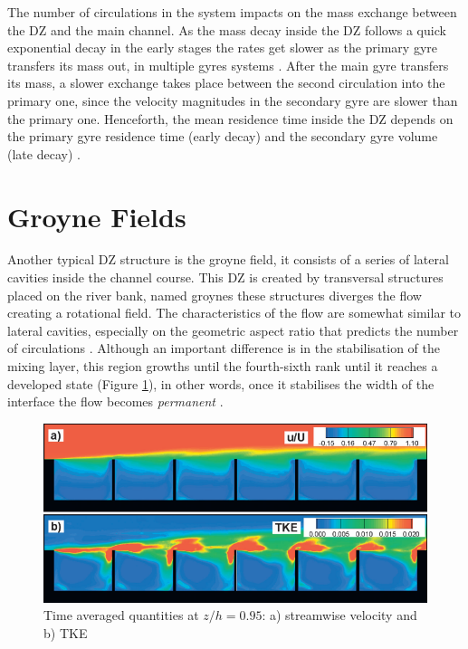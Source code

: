The number of circulations in the system impacts on the mass exchange between the DZ and the main channel. As the mass decay inside the DZ follows a quick exponential decay in the early stages the rates get slower as the primary gyre transfers its mass out, in multiple gyres systems \cite{jackson2012}. After the main gyre transfers its mass, a slower exchange takes place between the second circulation into the primary one, since the velocity magnitudes in the secondary gyre are slower than the primary one. Henceforth, the mean residence time inside the DZ depends on the primary gyre residence time (early decay) and the secondary gyre volume (late decay) \cite{jackson2013}.

\section{Groyne Fields}
Another typical DZ structure is the groyne field, it consists of a series of lateral cavities inside the channel course. This DZ is created by transversal structures placed on the river bank, named groynes these structures diverges the flow creating a rotational field. The characteristics of the flow are somewhat similar to lateral cavities, especially on the geometric aspect ratio that predicts the number of circulations \cite{weitbrecht2004,uijttewaal2005,xiang2020}. Although an important difference is in the stabilisation of the mixing layer, this region growths until the fourth-sixth rank until it reaches a developed state (Figure \ref{fig:groyneStabilisation}), in other words, once it stabilises the width of the interface the flow becomes \textit{permanent} \cite{weitbrecht2004, mcCoy2008, xiang2020}.

\begin{figure}[!ht]
\centering
\includegraphics[width=0.9\linewidth]{../images/introduction/groyneStabilisation.png}
\caption{Time averaged quantities at $z/h=0.95$: a) streamwise velocity and b) TKE \cite{mcCoy2008}}
\label{fig:groyneStabilisation}
\end{figure}


